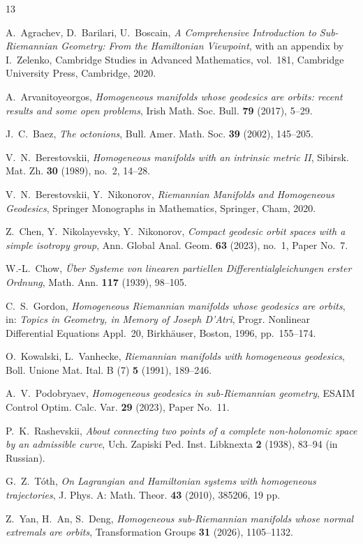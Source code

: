 \documentclass[12pt]{amsart}
\theoremstyle{plain}
\theoremstyle{definition}
\theoremstyle{remark}
\begin{document}
\begin{thebibliography}{13}

 A.~Agrachev, D.~Barilari, U.~Boscain,
\emph{A Comprehensive Introduction to Sub-Riemannian Geometry: From the Hamiltonian Viewpoint},
with an appendix by I.~Zelenko, Cambridge Studies in Advanced Mathematics, vol.~181, Cambridge
University Press, Cambridge, 2020.

 A.~Arvanitoyeorgos,
\emph{Homogeneous manifolds whose geodesics are orbits: recent results and some open problems},
Irish Math. Soc. Bull. \textbf{79} (2017), 5--29.

 J.~C.~Baez, \emph{The octonions}, Bull. Amer. Math. Soc. \textbf{39} (2002),
145--205.

 V.~N.~Berestovskii,
\emph{Homogeneous manifolds with an intrinsic metric II}, Sibirsk. Mat. Zh. \textbf{30} (1989),
no.~2, 14--28.

 V.~N.~Berestovskii, Y.~Nikonorov,
\emph{Riemannian Manifolds and Homogeneous Geodesics}, Springer Monographs in Mathematics,
Springer, Cham, 2020.

 Z.~Chen, Y.~Nikolayevsky, Y.~Nikonorov,
\emph{Compact geodesic orbit spaces with a simple isotropy group}, Ann. Global Anal. Geom.
\textbf{63} (2023), no.~1, Paper No.~7.

 W.-L.~Chow,
\emph{\"Uber Systeme von linearen partiellen Differentialgleichungen erster Ordnung}, Math. Ann.
\textbf{117} (1939), 98--105.

 C.~S.~Gordon,
\emph{Homogeneous Riemannian manifolds whose geodesics are orbits}, in: \emph{Topics in Geometry,
in Memory of Joseph D'Atri}, Progr. Nonlinear Differential Equations Appl.~20, Birkh\"auser,
Boston, 1996, pp.~155--174.

 O.~Kowalski, L.~Vanhecke,
\emph{Riemannian manifolds with homogeneous geodesics}, Boll. Unione Mat. Ital. B (7)
\textbf{5} (1991), 189--246.

 A.~V.~Podobryaev,
\emph{Homogeneous geodesics in sub-Riemannian geometry}, ESAIM Control Optim. Calc. Var.
\textbf{29} (2023), Paper No.~11.

 P.~K.~Rashevskii,
\emph{About connecting two points of a complete non-holonomic space by an admissible curve},
Uch. Zapiski Ped. Inst. Libknexta \textbf{2} (1938), 83--94 (in Russian).

 G.~Z.~T\'oth,
\emph{On Lagrangian and Hamiltonian systems with homogeneous trajectories}, J. Phys. A: Math.
Theor. \textbf{43} (2010), 385206, 19 pp.

 Z.~Yan, H.~An, S.~Deng,
\emph{Homogeneous sub-Riemannian manifolds whose normal extremals are orbits}, Transformation
Groups \textbf{31} (2026), 1105--1132.

\end{thebibliography}
\end{document}
